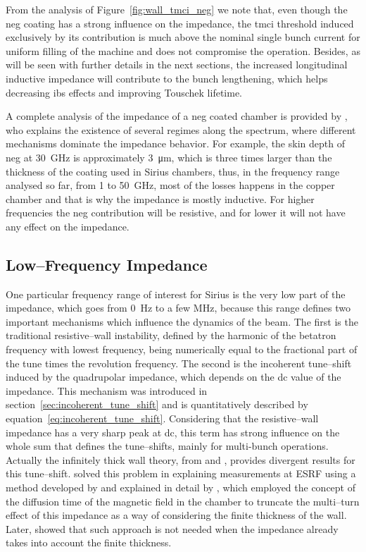     From the analysis of Figure~\ref{fig:wall_tmci_neg} we note that, even though the \gls{neg} coating has a strong influence on the impedance, the \gls{tmci} threshold induced exclusively by its contribution is much above the nominal single bunch current for uniform filling of the machine and does not compromise the operation. Besides, as will be seen with further details in the next sections, the increased longitudinal inductive impedance will contribute to the bunch lengthening, which helps decreasing \gls{ibs} effects and improving Touschek lifetime.

    A complete analysis of the impedance of a \gls{neg} coated chamber is provided by , who explains the existence of several regimes along the spectrum, where different mechanisms dominate the impedance behavior. For example, the skin depth of \gls{neg} at \SI{30}{\giga\hertz} is approximately \SI{3}{\micro\meter}, which is three times larger than the thickness of the coating used in Sirius chambers, thus, in the frequency range analysed so far, from \SI{1}{} to \SI{50}{\giga\hertz}, most of the losses happens in the copper chamber and that is why the impedance is mostly inductive. For higher frequencies the \gls{neg} contribution will be resistive, and for lower it will not have any effect on the impedance.

\subsection{Low--Frequency Impedance}

    One particular frequency range of interest for Sirius is the very low part of the impedance, which goes from \SI{0}{\hertz} to a few \si{\mega\hertz}, because this range defines two important mechanisms which influence the dynamics of the beam. The first is the traditional resistive--wall instability, defined by the harmonic of the betatron frequency with lowest frequency, being numerically equal to the fractional part of the tune times the revolution frequency. The second is the incoherent tune--shift induced by the quadrupolar impedance, which depends on the \gls{dc} value of the impedance. This mechanism was introduced in section~\ref{sec:incoherent_tune_shift} and is quantitatively described by equation~\eqref{eq:incoherent_tune_shift}. Considering that the resistive--wall impedance has a very sharp peak at \gls{dc}, this term has strong influence on the whole sum that defines the tune--shifts, mainly for multi-bunch operations.
    Actually the infinitely thick wall theory, from  and , provides divergent results for this tune--shift.  solved this problem in explaining measurements at ESRF using a method developed by  and explained in detail by , which employed the concept of the diffusion time of the magnetic field in the chamber to truncate the multi--turn effect of this impedance as a way of considering the finite thickness of the wall. Later,  showed that such approach is not needed when the impedance already takes into account the finite thickness.

